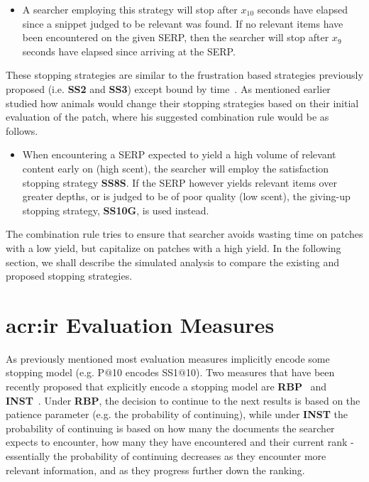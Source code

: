 \begin{itemize}
    \item[\blueboxbold{SS10}] A searcher employing this strategy will stop after $x_10$ seconds have elapsed since a snippet judged to be relevant was found. If no relevant items have been encountered on the given SERP, then the searcher will stop after $x_9$ seconds have elapsed since arriving at the SERP.
\end{itemize}

These stopping strategies are similar to the frustration based strategies previously proposed (i.e. \textbf{SS2} and \textbf{SS3}) except bound by time~\cite{gibbs1958number_rule}. As mentioned earlier ~\citet{mcnair1982gut_mvt} studied how animals would change their stopping strategies based on their initial evaluation  of the patch, where his suggested combination rule would be as follows.

\begin{itemize}
    \item[\blueboxbold{SS11}] When encountering a SERP expected to yield a high volume of relevant content early on (high scent), the searcher will employ the satisfaction stopping strategy \textbf{SS8S}. If the SERP however yields relevant items over greater depths, or is judged to be of poor quality (low scent), the giving-up stopping strategy, \textbf{SS10G}, is used instead.
\end{itemize}

The combination rule tries to ensure that searcher avoids wasting time on patches with a low yield, but capitalize on patches with a high yield. In the following section, we shall describe the simulated analysis to compare the existing and proposed stopping strategies.

\section{\gls{acr:ir} Evaluation Measures}
As previously mentioned most evaluation measures implicitly encode some stopping model (e.g. P$@$10 encodes SS1$@$10). Two measures that have been recently proposed that explicitly encode a stopping model are \textbf{RBP}~\cite{moffat2008rbp} and \textbf{INST}~\cite{bailey2015inst, moffat2015inst}. 
Under \textbf{RBP}, the decision to continue to the next results is based on the patience parameter (e.g. the probability of continuing), while under \textbf{INST} the probability of continuing is based on how many the documents the searcher expects to encounter, how many they have encountered and their current rank - essentially the probability of continuing decreases as they encounter more relevant information, and as they progress further down the ranking.

